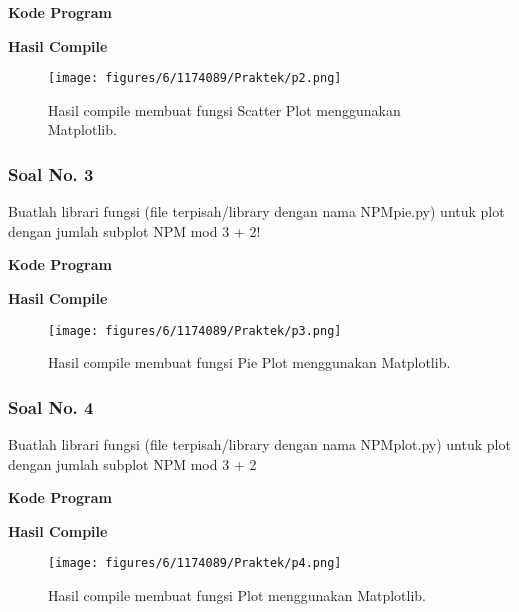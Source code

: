 \hfill \break
\textbf{Kode Program}



\hfill \break
\textbf{Hasil Compile}

\begin{figure}[H]
	\texttt{[image: figures/6/1174089/Praktek/p2.png]}
	\centering
	\caption{Hasil compile membuat fungsi Scatter Plot menggunakan Matplotlib.}
\end{figure}

\subsubsection{Soal No. 3}
\hfill \break
Buatlah librari fungsi (file terpisah/library dengan nama NPMpie.py) untuk plot dengan jumlah subplot NPM mod 3 + 2!

\hfill \break
\textbf{Kode Program}



\hfill \break
\textbf{Hasil Compile}

\begin{figure}[H]
	\texttt{[image: figures/6/1174089/Praktek/p3.png]}
	\centering
	\caption{Hasil compile membuat fungsi Pie Plot menggunakan Matplotlib.}
\end{figure}

\subsubsection{Soal No. 4}
\hfill \break
Buatlah librari fungsi (file terpisah/library dengan nama NPMplot.py) untuk plot dengan jumlah subplot NPM mod 3 + 2

\hfill \break
\textbf{Kode Program}



\hfill \break
\textbf{Hasil Compile}

\begin{figure}[H]
	\texttt{[image: figures/6/1174089/Praktek/p4.png]}
	\centering
	\caption{Hasil compile membuat fungsi Plot menggunakan Matplotlib.}
\end{figure}



